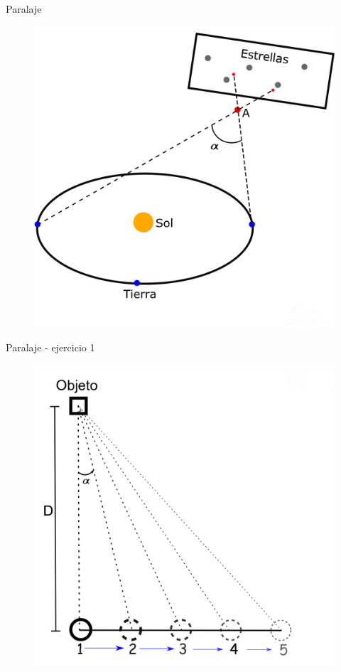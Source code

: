 \documentclass{beamer}
\begin{document}
\begin{frame}{Paralaje}
  \begin{figure}
   \centering
   \includegraphics[scale=0.23]{Imagenes/Paralaje_01}
  \end{figure}
\end{frame}

\begin{frame}{Paralaje - ejercicio 1}
  \begin{figure}
   \centering
   \includegraphics[scale=0.23]{Imagenes/Paralaje_02}
  \end{figure}
\end{frame}
\end{document}
